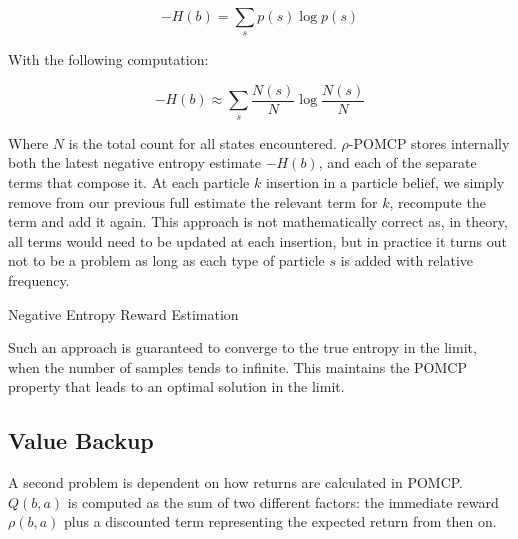 \[ -H(b) = \sum_s p(s) \log p(s) \]

With the following computation:

\[ -H(b) \approx \sum_s \frac{N(s)}{N} \log \frac{N(s)}{N} \]

Where $N$ is the total count for all states encountered. $\rho$-POMCP stores internally both the
latest negative entropy estimate $-H(b)$, and each of the separate terms that compose it. At each
particle $k$ insertion in a particle belief, we simply remove from our previous full estimate the
relevant term for $k$, recompute the term and add it again. This approach is not mathematically
correct as, in theory, all terms would need to be updated at each insertion, but in practice it
turns out not to be a problem as long as each type of particle $s$ is added with relative frequency.

\begin{algorithm}[H]
    \caption{Negative Entropy Reward Estimation}


\end{algorithm}

Such an approach is guaranteed to converge to the true entropy in the limit, when the number of
samples tends to infinite. This maintains the POMCP property that leads to an optimal solution in
the limit.

%

\subsection{Value Backup}

A second problem is dependent on how returns are calculated in POMCP. $Q(b,a)$ is computed as the
sum of two different factors: the immediate reward $\rho(b,a)$ plus a discounted term representing
the expected return from then on.

